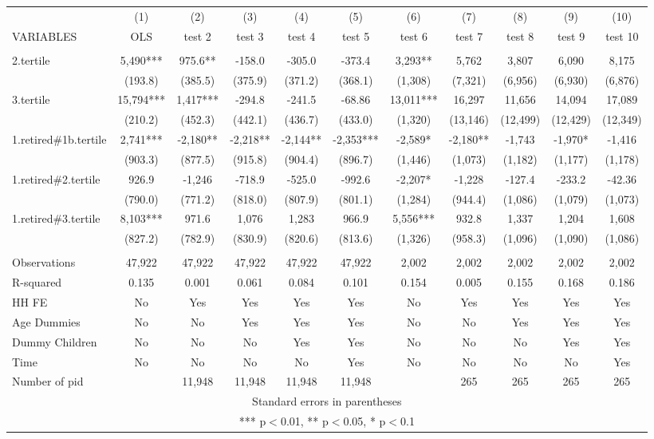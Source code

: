 \begin{tabular}{lcccccccccc} \hline
 & (1) & (2) & (3) & (4) & (5) & (6) & (7) & (8) & (9) & (10) \\
VARIABLES & OLS & test 2 & test 3 & test 4 & test 5 & test 6 & test 7 & test 8 & test 9 & test 10 \\ \hline
 &  &  &  &  &  &  &  &  &  &  \\
2.tertile & 5,490*** & 975.6** & -158.0 & -305.0 & -373.4 & 3,293** & 5,762 & 3,807 & 6,090 & 8,175 \\
 & (193.8) & (385.5) & (375.9) & (371.2) & (368.1) & (1,308) & (7,321) & (6,956) & (6,930) & (6,876) \\
3.tertile & 15,794*** & 1,417*** & -294.8 & -241.5 & -68.86 & 13,011*** & 16,297 & 11,656 & 14,094 & 17,089 \\
 & (210.2) & (452.3) & (442.1) & (436.7) & (433.0) & (1,320) & (13,146) & (12,499) & (12,429) & (12,349) \\
1.retired\#1b.tertile & 2,741*** & -2,180** & -2,218** & -2,144** & -2,353*** & -2,589* & -2,180** & -1,743 & -1,970* & -1,416 \\
 & (903.3) & (877.5) & (915.8) & (904.4) & (896.7) & (1,446) & (1,073) & (1,182) & (1,177) & (1,178) \\
1.retired\#2.tertile & 926.9 & -1,246 & -718.9 & -525.0 & -992.6 & -2,207* & -1,228 & -127.4 & -233.2 & -42.36 \\
 & (790.0) & (771.2) & (818.0) & (807.9) & (801.1) & (1,284) & (944.4) & (1,086) & (1,079) & (1,073) \\
1.retired\#3.tertile & 8,103*** & 971.6 & 1,076 & 1,283 & 966.9 & 5,556*** & 932.8 & 1,337 & 1,204 & 1,608 \\
 & (827.2) & (782.9) & (830.9) & (820.6) & (813.6) & (1,326) & (958.3) & (1,096) & (1,090) & (1,086) \\
 &  &  &  &  &  &  &  &  &  &  \\
Observations & 47,922 & 47,922 & 47,922 & 47,922 & 47,922 & 2,002 & 2,002 & 2,002 & 2,002 & 2,002 \\
R-squared & 0.135 & 0.001 & 0.061 & 0.084 & 0.101 & 0.154 & 0.005 & 0.155 & 0.168 & 0.186 \\
HH FE & No & Yes & Yes & Yes & Yes & No & Yes & Yes & Yes & Yes \\
Age Dummies & No & No & Yes & Yes & Yes & No & No & Yes & Yes & Yes \\
Dummy Children & No & No & No & Yes & Yes & No & No & No & Yes & Yes \\
Time & No & No & No & No & Yes & No & No & No & No & Yes \\
 Number of pid &  & 11,948 & 11,948 & 11,948 & 11,948 &  & 265 & 265 & 265 & 265 \\ \hline
\multicolumn{11}{c}{ Standard errors in parentheses} \\
\multicolumn{11}{c}{ *** p$<$0.01, ** p$<$0.05, * p$<$0.1} \\
\end{tabular}
